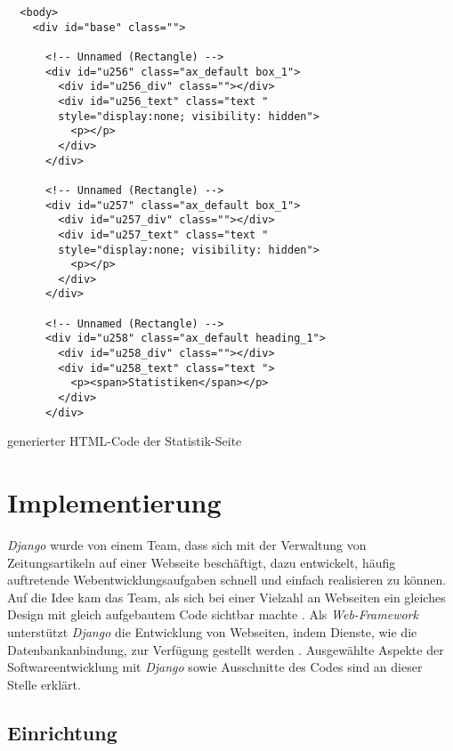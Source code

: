 \documentclass[11pt,a4paper]{report}
\begin{document}
\begin{listing}[htbp]
\begin{lstlisting}
  <body>
    <div id="base" class="">

      <!-- Unnamed (Rectangle) -->
      <div id="u256" class="ax_default box_1">
        <div id="u256_div" class=""></div>
        <div id="u256_text" class="text " 
        style="display:none; visibility: hidden">
          <p></p>
        </div>
      </div>

      <!-- Unnamed (Rectangle) -->
      <div id="u257" class="ax_default box_1">
        <div id="u257_div" class=""></div>
        <div id="u257_text" class="text " 
        style="display:none; visibility: hidden">
          <p></p>
        </div>
      </div>

      <!-- Unnamed (Rectangle) -->
      <div id="u258" class="ax_default heading_1">
        <div id="u258_div" class=""></div>
        <div id="u258_text" class="text ">
          <p><span>Statistiken</span></p>
        </div>
      </div>
\end{lstlisting}
\caption{generierter HTML-Code der Statistik-Seite}
\label{code:badhtml}
\end{listing}






\chapter{Implementierung} 
\label{c:imp}

\textit{Django} wurde von einem Team, dass sich mit der Verwaltung von Zeitungsartikeln auf einer Webseite beschäftigt, dazu entwickelt, häufig auftretende Webentwicklungsaufgaben schnell und einfach realisieren zu können.  Auf die Idee kam das Team, als sich bei einer Vielzahl an Webseiten ein gleiches Design mit gleich aufgebautem Code sichtbar machte \cite{mozillatuto1}. Als \textit{Web-Framework} unterstützt \textit{Django} die Entwicklung von Webseiten, indem Dienste, wie die Datenbankanbindung, zur Verfügung gestellt werden \cite{webframe}. Ausgewählte Aspekte der Softwareentwicklung mit \textit{Django} sowie Ausschnitte des Codes sind an dieser Stelle erklärt.


\section{Einrichtung}
\end{document}
